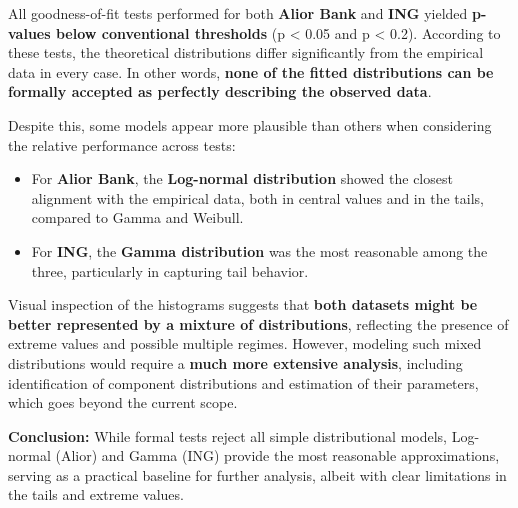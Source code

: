 \documentclass[
]{article}
\providecommand{\tightlist}{%
  \setlength{\itemsep}{0pt}\setlength{\parskip}{0pt}}
\begin{document}
All goodness-of-fit tests performed for both \textbf{Alior Bank} and
\textbf{ING} yielded \textbf{p-values below conventional thresholds} (p
\textless{} 0.05 and p \textless{} 0.2). According to these tests, the
theoretical distributions differ significantly from the empirical data
in every case. In other words, \textbf{none of the fitted distributions
can be formally accepted as perfectly describing the observed data}.

Despite this, some models appear more plausible than others when
considering the relative performance across tests:

\begin{itemize}
\tightlist
\item
  For \textbf{Alior Bank}, the \textbf{Log-normal distribution} showed
  the closest alignment with the empirical data, both in central values
  and in the tails, compared to Gamma and Weibull.\\
\item
  For \textbf{ING}, the \textbf{Gamma distribution} was the most
  reasonable among the three, particularly in capturing tail behavior.
\end{itemize}

Visual inspection of the histograms suggests that \textbf{both datasets
might be better represented by a mixture of distributions}, reflecting
the presence of extreme values and possible multiple regimes. However,
modeling such mixed distributions would require a \textbf{much more
extensive analysis}, including identification of component distributions
and estimation of their parameters, which goes beyond the current scope.

\textbf{Conclusion:} While formal tests reject all simple distributional
models, Log-normal (Alior) and Gamma (ING) provide the most reasonable
approximations, serving as a practical baseline for further analysis,
albeit with clear limitations in the tails and extreme values.
\end{document}
